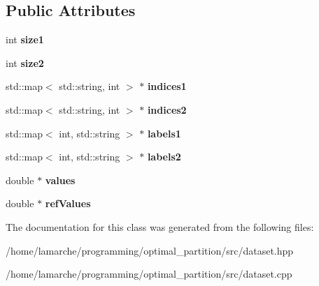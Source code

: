 \subsection*{Public Attributes}
\begin{DoxyCompactItemize}
\item 
\hypertarget{classDataset_a1cde47fee5ecc5f5f26c5ab3bb0331e3}{int {\bfseries size1}}\label{classDataset_a1cde47fee5ecc5f5f26c5ab3bb0331e3}

\item 
\hypertarget{classDataset_aaee19e6556e5168943fd128d38889a91}{int {\bfseries size2}}\label{classDataset_aaee19e6556e5168943fd128d38889a91}

\item 
\hypertarget{classDataset_ad7c03e01fa34e8986144340a6ddcf53c}{std\-::map$<$ std\-::string, int $>$ $\ast$ {\bfseries indices1}}\label{classDataset_ad7c03e01fa34e8986144340a6ddcf53c}

\item 
\hypertarget{classDataset_ade1e047d83395ee7f2241dbb25dd1455}{std\-::map$<$ std\-::string, int $>$ $\ast$ {\bfseries indices2}}\label{classDataset_ade1e047d83395ee7f2241dbb25dd1455}

\item 
\hypertarget{classDataset_a4598a42f6e129c3b073f62645a1c2893}{std\-::map$<$ int, std\-::string $>$ $\ast$ {\bfseries labels1}}\label{classDataset_a4598a42f6e129c3b073f62645a1c2893}

\item 
\hypertarget{classDataset_a01dc253aff164fb556d9d203b29a059f}{std\-::map$<$ int, std\-::string $>$ $\ast$ {\bfseries labels2}}\label{classDataset_a01dc253aff164fb556d9d203b29a059f}

\item 
\hypertarget{classDataset_a3554a3c5723716a89be372b946d04f54}{double $\ast$ {\bfseries values}}\label{classDataset_a3554a3c5723716a89be372b946d04f54}

\item 
\hypertarget{classDataset_a4a03dd925f63d0611c75223850c93569}{double $\ast$ {\bfseries ref\-Values}}\label{classDataset_a4a03dd925f63d0611c75223850c93569}

\end{DoxyCompactItemize}


The documentation for this class was generated from the following files\-:\begin{DoxyCompactItemize}
\item 
/home/lamarche/programming/optimal\-\_\-partition/src/dataset.\-hpp\item 
/home/lamarche/programming/optimal\-\_\-partition/src/dataset.\-cpp\end{DoxyCompactItemize}
